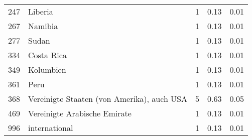 \begin{longtable}{lXrrr}
        247 & \multicolumn{1}{X}{Liberia} & %
          \num{1} &
          \num[round-mode=places,round-precision=2]{0,13} &
          \num[round-mode=places,round-precision=2]{0,01} \\

        267 & \multicolumn{1}{X}{Namibia} & %
          \num{1} &
          \num[round-mode=places,round-precision=2]{0,13} &
          \num[round-mode=places,round-precision=2]{0,01} \\

        277 & \multicolumn{1}{X}{Sudan} & %
          \num{1} &
          \num[round-mode=places,round-precision=2]{0,13} &
          \num[round-mode=places,round-precision=2]{0,01} \\

        334 & \multicolumn{1}{X}{Costa Rica} & %
          \num{1} &
          \num[round-mode=places,round-precision=2]{0,13} &
          \num[round-mode=places,round-precision=2]{0,01} \\

        349 & \multicolumn{1}{X}{Kolumbien} & %
          \num{1} &
          \num[round-mode=places,round-precision=2]{0,13} &
          \num[round-mode=places,round-precision=2]{0,01} \\

        361 & \multicolumn{1}{X}{Peru} & %
          \num{1} &
          \num[round-mode=places,round-precision=2]{0,13} &
          \num[round-mode=places,round-precision=2]{0,01} \\

        368 & \multicolumn{1}{X}{Vereinigte Staaten (von Amerika), auch USA} & %
          \num{5} &
          \num[round-mode=places,round-precision=2]{0,63} &
          \num[round-mode=places,round-precision=2]{0,05} \\

        469 & \multicolumn{1}{X}{Vereinigte Arabische Emirate} & %
          \num{1} &
          \num[round-mode=places,round-precision=2]{0,13} &
          \num[round-mode=places,round-precision=2]{0,01} \\

        996 & \multicolumn{1}{X}{international} & %
          \num{1} &
          \num[round-mode=places,round-precision=2]{0,13} &
          \num[round-mode=places,round-precision=2]{0,01} \\


\end{longtable}
